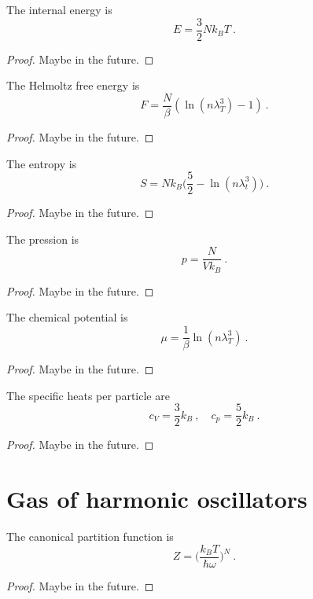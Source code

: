     The internal energy is 
    \begin{equation*}
        E = \frac{3}{2} N k_B T ~.
    \end{equation*}
    \begin{proof}
        Maybe in the future.
    \end{proof}
    
    The Helmoltz free energy is 
    \begin{equation*}
        F = \frac{N}{\beta} ( \ln (n \lambda^3_T) - 1) ~.
    \end{equation*}
    \begin{proof}
        Maybe in the future.
    \end{proof}
    
    The entropy is 
    \begin{equation*}
        S = N k_B \Big ( \frac{5}{2} - \ln(n \lambda_t^3) \Big) ~.
    \end{equation*}
    \begin{proof}
        Maybe in the future.
    \end{proof}
    
    The pression is 
    \begin{equation*}
        p = \frac{N}{V k_B} ~.
    \end{equation*}
    \begin{proof}
        Maybe in the future.
    \end{proof}
    
    The chemical potential is 
    \begin{equation*}
        \mu = \frac{1}{\beta} \ln (n \lambda^3_T) ~.
    \end{equation*}
    \begin{proof}
        Maybe in the future.
    \end{proof}

    The specific heats per particle are 
    \begin{equation*}
        c_V = \frac{3}{2} k_B ~, \quad c_p = \frac{5}{2} k_B ~. 
    \end{equation*}
    \begin{proof}
        Maybe in the future.
    \end{proof}

\section{Gas of harmonic oscillators}

    The canonical partition function is 
    \begin{equation*}
        Z = \Big ( \frac{k_B T}{\hbar \omega}\Big)^N ~.
    \end{equation*}
    \begin{proof}
        Maybe in the future.
    \end{proof}
    
